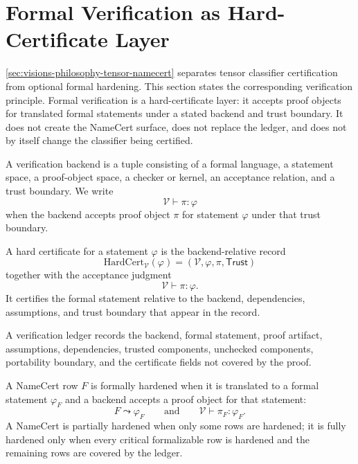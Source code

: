\section{Formal Verification as Hard-Certificate Layer}
\label{sec:visions-philosophy-hard-certificate-layer}

\autoref{sec:visions-philosophy-tensor-namecert} separates tensor
classifier certification from optional formal hardening. This section
states the corresponding verification principle. Formal verification is
a hard-certificate layer: it accepts proof objects for translated formal
statements under a stated backend and trust boundary. It does not create
the NameCert surface, does not replace the ledger, and does not by itself
change the classifier being certified.

\begin{definition}
\label{def:philosophy-verification-backend}
A verification backend is a tuple consisting of a formal language, a
statement space, a proof-object space, a checker or kernel, an acceptance
relation, and a trust boundary. We write
$$
\mathcal{V}\vdash \pi:\varphi
$$
when the backend accepts proof object $\pi$ for statement $\varphi$ under
that trust boundary.
\end{definition}

\begin{definition}
\label{def:philosophy-hard-certificate}
A hard certificate for a statement $\varphi$ is the backend-relative
record
$$
\mathrm{HardCert}_{\mathcal{V}}(\varphi)
=
(\mathcal{V},\varphi,\pi,\mathsf{Trust})
$$
together with the acceptance judgment
$$
\mathcal{V}\vdash \pi:\varphi.
$$
It certifies the formal statement relative to the backend, dependencies,
assumptions, and trust boundary that appear in the record.
\end{definition}

\begin{definition}
\label{def:philosophy-verification-ledger}
A verification ledger records the backend, formal statement, proof
artifact, assumptions, dependencies, trusted components, unchecked
components, portability boundary, and the certificate fields not covered
by the proof.
\end{definition}

\begin{definition}
\label{def:philosophy-formal-hardening}
A NameCert row $F$ is formally hardened when it is translated to a
formal statement $\varphi_F$ and a backend accepts a proof object for
that statement:
$$
F\leadsto\varphi_F
\qquad\text{and}\qquad
\mathcal{V}\vdash \pi_F:\varphi_F.
$$
A NameCert is partially hardened when only some rows are hardened; it is
fully hardened only when every critical formalizable row is hardened and
the remaining rows are covered by the ledger.
\end{definition}

